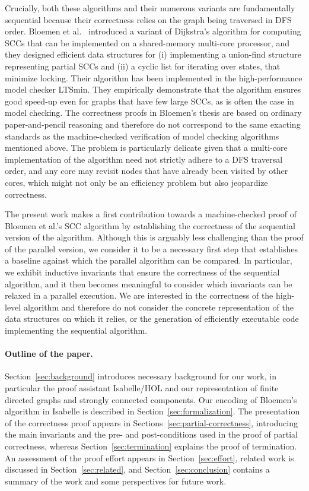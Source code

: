 \documentclass[sigplan,10pt,anonymous,review]{acmart}
\begin{document}
Crucially, both these algorithms and their numerous variants are fundamentally sequential because their correctness relies on the graph being traversed in DFS order. Bloemen et al.~\cite{bloemen:strong,bloemen:multi-core} introduced a variant of Dijkstra's algorithm for computing SCCs that can be implemented on a shared-memory multi-core processor, and they designed efficient data structures for (i) implementing a union-find structure representing partial SCCs and (ii) a cyclic list for iterating over states, that minimize locking. Their algorithm has been implemented in the high-performance model checker LTSmin. They empirically demonstrate that the algorithm ensures good speed-up even for graphs that have few large SCCs, as is often the case in model checking. The correctness proofs in Bloemen's thesis are based on ordinary paper-and-pencil reasoning and therefore do not correspond to the same exacting standards as the machine-checked verification of model checking algorithms mentioned above. The problem is particularly delicate given that a multi-core implementation of the algorithm need not strictly adhere to a DFS traversal order, and any core may revisit nodes that have already been visited by other cores, which might not only be an efficiency problem but also jeopardize correctness.

The present work makes a first contribution towards a machine-checked proof of Bloemen et al.'s SCC algorithm by establishing the correctness of the sequential version of the algorithm. Although this is arguably less challenging than the proof of the parallel version, we consider it to be a necessary first step that establishes a baseline against which the parallel algorithm can be compared. In particular, we exhibit inductive invariants that ensure the correctness of the sequential algorithm, and it then becomes meaningful to consider which invariants can be relaxed in a parallel execution. We are interested in the correctness of the high-level algorithm and therefore do not consider the concrete representation of the data structures on which it relies, or the generation of efficiently executable code implementing the sequential algorithm.


\paragraph{Outline of the paper.}

Section~\ref{sec:background} introduces necessary background for our work, in particular the proof assistant Isabelle/HOL and our representation of finite directed graphs and strongly connected components. Our encoding of Bloemen's algorithm in Isabelle is described in Section~\ref{sec:formalization}. The presentation of the correctness proof appears in Sections~\ref{sec:partial-correctness}, introducing the main invariants and the pre- and post-conditions used in the proof of partial correctness, whereas Section~\ref{sec:termination} explains the proof of termination. An assessment of the proof effort appears in Section~\ref{sec:effort}, related work is discussed in Section~\ref{sec:related}, and Section~\ref{sec:conclusion} contains a summary of the work and some perspectives for future work.
\end{document}
